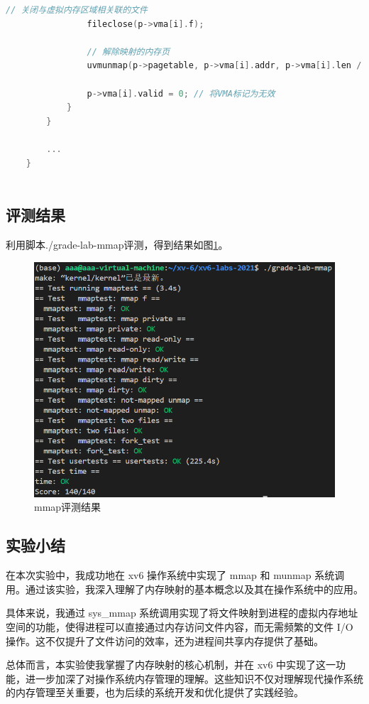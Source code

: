 \begin{enumerate}
\begin{lstlisting}[language=c,title=对exit函数的修改]
                // 关闭与虚拟内存区域相关联的文件
                fileclose(p->vma[i].f);
        
                // 解除映射的内存页
                uvmunmap(p->pagetable, p->vma[i].addr, p->vma[i].len / PGSIZE, 1);
        
                p->vma[i].valid = 0; // 将VMA标记为无效
            }
        }
    
        ...
    }   
                
    \end{lstlisting}
\end{enumerate}

\subsection{评测结果}
利用脚本./grade-lab-mmap评测，得到结果如图\ref{fig:mmap}。
\begin{figure}[h]
    \centering
    \includegraphics[width=\linewidth]{pics/mmap评测结果.png}
    \caption{mmap评测结果}
    \label{fig:mmap}
\end{figure}
\subsection{实验小结}
在本次实验中，我成功地在 xv6 操作系统中实现了 mmap 和 munmap 系统调用。通过该实验，我深入理解了内存映射的基本概念以及其在操作系统中的应用。

具体来说，我通过 sys\_mmap 系统调用实现了将文件映射到进程的虚拟内存地址空间的功能，使得进程可以直接通过内存访问文件内容，而无需频繁的文件 I/O 操作。这不仅提升了文件访问的效率，还为进程间共享内存提供了基础。

总体而言，本实验使我掌握了内存映射的核心机制，并在 xv6 中实现了这一功能，进一步加深了对操作系统内存管理的理解。这些知识不仅对理解现代操作系统的内存管理至关重要，也为后续的系统开发和优化提供了实践经验。
